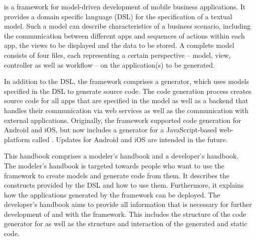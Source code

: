 
\MD is a framework for model-driven development of mobile business applications. It provides a domain specific language (DSL) for the specification of a textual model. Such a model can describe characteristics of a business scenario, including the communication between different apps and sequences of actions within each app, the views to be displayed and the data to be stored. A complete \MD model consists of four files, each representing a certain perspective -- model, view, controller as well as workflow -- on the application(s) to be generated.

In addition to the DSL, the \MD framework comprises a generator, which uses models specified in the DSL to generate source code. The code generation process creates source code for all apps that are specified in the model as well as a backend that handles their communication via web services as well as the communication with external applications. Originally, the \MD framework supported code generation for Android and iOS, but now includes a generator for a JavaScript-based web-platform called \mapapps. Updates for Android and iOS are intended in the future.

This handbook comprises a modeler's handbook and a developer's handbook. The modeler's handbook is targeted towards people who want to use the \MD framework to create models and generate code from them. It describes the constructs provided by the DSL and how to use them. Furthermore, it explains how the applications generated by the framework can be deployed. The developer's handbook aims to provide all information that is necessary for further development of and with the \MD framework. This includes the structure of the code generator for \mapapps as well as the structure and interaction of the generated and static code.
